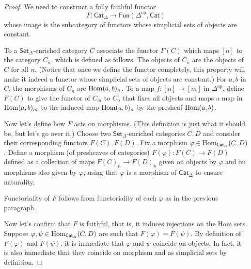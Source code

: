 \begin{proof}
We need to construct a fully faithful functor
$$
F:\mathsf{Cat}_\Delta \to \mathsf{Fun}(\Delta^{\text{op}},\mathsf{Cat})
$$
whose image is the subcategory of functors 
whose simplicial sets of objects are constant.

To a $\mathsf{Set}_\Delta$-enriched category $C$ 
associate the functor $F(C)$ which maps $[n]$ 
to the category $C_n$, which is defined as follows.
The objects of $C_n$ are the objects of $C$ for all $n$.
(Notice that once we define the functor completely,
this property will make it indeed a functor whose simplicial
sets of objects are constant.) 
For $a,b$ in $C$, the morphisms of $C_n$ 
are $\mathop{\mathrm{Hom}}\nolimits(a,b)_n$. To a map $f:[n] \to [m]$ in $\Delta^{\text{op}}$,
define $F(C)$ to give the functor of $C_m$ to $C_n$ that fixes
all objects and maps a map in $\mathop{\mathrm{Hom}}\nolimits(a,b)_m$ 
to the induced map $\mathop{\mathrm{Hom}}\nolimits(a,b)_n$ by the presheaf
$\mathop{\mathrm{Hom}}\nolimits(a,b)$.

Now let's define how $F$ acts on morphisms. 
(This definition is just what it should be, but let's go over it.)
Choose two
$\mathsf{Set}_\Delta$-enriched categories $C,D$ 
and consider their corresponding functors $F(C),F(D)$.
Fix a morphism $\varphi \in \mathop{\mathrm{Hom}}\nolimits_{\mathsf{Cat}_\Delta}(C,D)$.
Define a morphism (of presheaves of categories) 
$F(\varphi):F(C) \to F(D)$
defined as a collection of maps $F(C)_n \to F(D)_n$
given on objects by $\varphi$ and on morphisms
also given by $\varphi$, using that $\varphi$ is a morphism
of $\mathsf{Cat}_\Delta$ to ensure naturality.

Functoriality of $F$ follows from functoriality of each $\varphi$ as in the
previous paragraph.

Now let's confirm that $F$ is faithful, that is, it induces injections
on the Hom sets. Suppose $\varphi,\psi \in \mathop{\mathrm{Hom}}\nolimits_{\mathsf{Cat}_\Delta}(C,D)$ 
are such that $F(\varphi)=F(\psi)$. By definition of $F(\varphi)$ and
 $F(\psi)$, it is immediate that $\varphi$ and $\psi$ coincide on objects.
In fact, it is also immediate that they coincide on morphism and as
simplicial sets by definition.


\end{proof}
